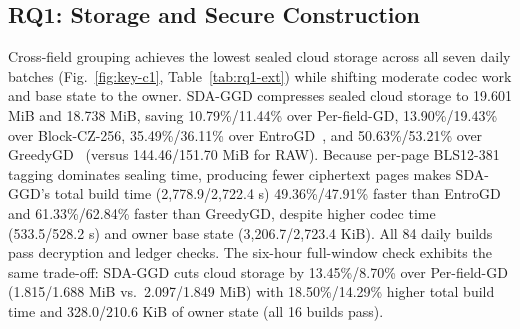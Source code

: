 \documentclass[10pt,journal]{IEEEtran}
\begin{document}
\subsection{RQ1: Storage and Secure Construction}
Cross-field grouping achieves the lowest sealed cloud storage across all seven daily batches (Fig.~\ref{fig:key-c1}, Table~\ref{tab:rq1-ext}) while shifting moderate codec work and base state to the owner. SDA-GGD compresses sealed cloud storage to 19.601 MiB and 18.738 MiB, saving 10.79\%/11.44\% over Per-field-GD, 13.90\%/19.43\% over Block-CZ-256, 35.49\%/36.11\% over EntroGD~\cite{Zhao2026EntroGD}, and 50.63\%/53.21\% over GreedyGD~\cite{Hurst2024GreedyGD} (versus 144.46/151.70 MiB for RAW). Because per-page BLS12-381 tagging dominates sealing time, producing fewer ciphertext pages makes SDA-GGD's total build time (2,778.9/2,722.4 s) 49.36\%/47.91\% faster than EntroGD and 61.33\%/62.84\% faster than GreedyGD, despite higher codec time (533.5/528.2 s) and owner base state (3,206.7/2,723.4 KiB). All 84 daily builds pass decryption and ledger checks. The six-hour full-window check exhibits the same trade-off: SDA-GGD cuts cloud storage by 13.45\%/8.70\% over Per-field-GD (1.815/1.688 MiB vs.\ 2.097/1.849 MiB) with 18.50\%/14.29\% higher total build time and 328.0/210.6 KiB of owner state (all 16 builds pass).
\end{document}
